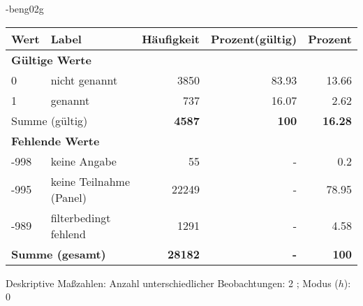                 \vspace*{-\baselineskip}
					\begin{filecontents}{\jobname-beng02g}
					\begin{longtable}{lXrrr}
					\toprule
					\textbf{Wert} & \textbf{Label} & \textbf{Häufigkeit} & \textbf{Prozent(gültig)} & \textbf{Prozent} \\
					\endhead
					\midrule
					\multicolumn{5}{l}{\textbf{Gültige Werte}}\\

					0 &
					\multicolumn{1}{X}{ nicht genannt   } &


					  \num{3850} &
					  \num[round-mode=places,round-precision=2]{83.93} &
					    \num[round-mode=places,round-precision=2]{13.66} \\

					1 &
					\multicolumn{1}{X}{ genannt   } &


					  \num{737} &
					  \num[round-mode=places,round-precision=2]{16.07} &
					    \num[round-mode=places,round-precision=2]{2.62} \\
					\midrule
					\multicolumn{2}{l}{Summe (gültig)} &
					  \textbf{\num{4587}} &
					\textbf{100} &
					  \textbf{\num[round-mode=places,round-precision=2]{16.28}} \\
					\multicolumn{5}{l}{\textbf{Fehlende Werte}}\\
							-998 &
							keine Angabe &
							  \num{55} &
							 - &
							  \num[round-mode=places,round-precision=2]{0.2} \\
							-995 &
							keine Teilnahme (Panel) &
							  \num{22249} &
							 - &
							  \num[round-mode=places,round-precision=2]{78.95} \\
							-989 &
							filterbedingt fehlend &
							  \num{1291} &
							 - &
							  \num[round-mode=places,round-precision=2]{4.58} \\
					\midrule
					\multicolumn{2}{l}{\textbf{Summe (gesamt)}} &
				      \textbf{\num{28182}} &
				    \textbf{-} &
				    \textbf{100} \\
					\bottomrule
					\end{longtable}
					\end{filecontents}
				\label{tableValues:beng02g}
				\vspace*{-\baselineskip}
                    \begin{noten}
                	    \note{} Deskriptive Maßzahlen:
                	    Anzahl unterschiedlicher Beobachtungen: 2%
                	    ; 
                	      Modus ($h$): 0
                     \end{noten}


